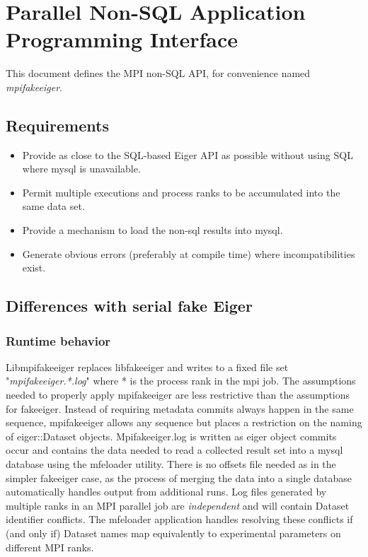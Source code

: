 \section{Parallel Non-SQL Application Programming Interface}
\label{sec:mpifakeapi}
This document defines the MPI non-SQL API, for convenience named {\em mpifakeeiger}.

\subsection{Requirements}

\begin{itemize}
\item Provide as close to the SQL-based Eiger API as possible without using SQL where mysql is unavailable.

\item Permit multiple executions and process ranks to be accumulated into the same data set.

\item Provide a mechanism to load the non-sql results into mysql.
 
\item Generate obvious errors (preferably at compile time) where incompatibilities exist.

\end{itemize}

\subsection{Differences with serial fake Eiger}

\subsubsection {Runtime behavior} 
Libmpifakeeiger replaces libfakeeiger and writes to a fixed file set "{\em mpifakeeiger.*.log}" where * is the process rank in the mpi job. The assumptions needed to properly apply mpifakeeiger are less restrictive than the assumptions for fakeeiger. Instead of requiring metadata commits always happen in the same sequence, mpifakeeiger allows any sequence but places a restriction on the naming of eiger::Dataset objects. Mpifakeeiger.log is written as eiger object commits occur and contains the data needed to read a collected result set into a mysql database using the mfeloader utility. There is no offsets file needed as in the simpler fakeeiger case, as the process of merging the data into a single database automatically handles output from additional runs.
 Log files generated by multiple ranks in an MPI parallel job are {\em independent} and will contain Dataset identifier conflicts. The mfeloader application handles resolving these conflicts if (and only if) Dataset names map equivalently to experimental parameters on different MPI ranks.

